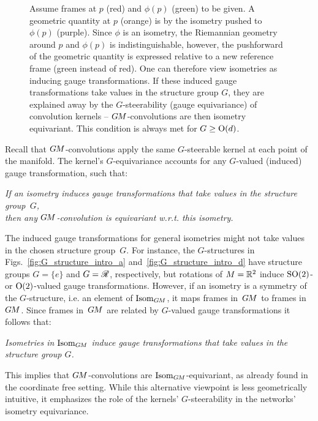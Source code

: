 \begin{figure}
{        Assume frames at $p$ (red) and $\phi(p)$ (green) to be given.
        A geometric quantity at $p$ (orange) is by the isometry pushed to $\phi(p)$ (purple).
        Since $\phi$ is an isometry, the Riemannian geometry around $p$ and $\phi(p)$ is indistinguishable, however, the pushforward of the geometric quantity is expressed relative to a new reference frame (green instead of red).
        One can therefore view isometries as inducing gauge transformations.
        If these induced gauge transformations take values in the structure group $G$, they are explained away by the $G$-steerability (gauge equivariance) of convolution kernels -- $G\mkern-1.4muM$-convolutions are then isometry equivariant.
        This condition is always met for $G\geq\operatorname{O}(d)$.
    }
    \label{fig:intro_gauge_isom_induction}
\end{figure}


Recall that $G\mkern-1.4muM$-convolutions apply the same $G$-steerable kernel at each point of the manifold.
The kernel's $G$-equivariance accounts for any $G$-valued (induced) gauge transformation, such that:
\begin{center}\it
    If an isometry induces gauge transformations that take values in the structure group~$G$, \\
    then any $G\mkern-1.4muM$-convolution is equivariant w.r.t. this isometry.
\end{center}


The induced gauge transformations for general isometries might not take values in the chosen structure group~$G$.
For instance, the $G$-structures in Figs.~\ref{fig:G_structure_intro_a} and~\ref{fig:G_structure_intro_d} have structure groups $G=\{e\}$ and $G=\mathscr{R}$, respectively, but rotations of $M=\mathbb{R}^2$ induce $\operatorname{SO}(2)$- or $\operatorname{O}(2)$-valued gauge transformations.
However, if an isometry is a symmetry of the $G$-structure, i.e. an element of $\operatorname{Isom}_{G\mkern-1.4muM}$, it maps frames in~$G\mkern-1.4muM$ to frames in~$G\mkern-1.4muM$.
Since frames in~$G\mkern-1.4muM$ are related by $G$-valued gauge transformations it follows that:
\begin{center}\it
    Isometries in $\operatorname{Isom}_{G\mkern-1.4muM}$ induce gauge transformations that take values in the structure group $G$.
\end{center}
This implies that $G\mkern-1.4muM$-convolutions are $\operatorname{Isom}_{G\mkern-1.4muM}$-equivariant, as already found in the coordinate free setting.
While this alternative viewpoint is less geometrically intuitive, it emphasizes the role of the kernels' $G$-steerability in the networks' isometry equivariance.




